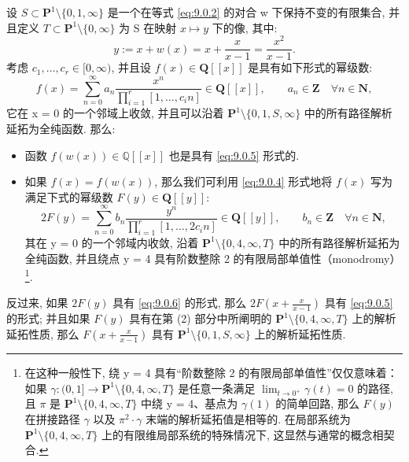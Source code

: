 \begin{lemma}\label{lem:9.0.3}
设 \(S \subset \mathbf{P}^1 \setminus \{0, 1, \infty\}\) 是一个在等式 \eqref{eq:9.0.2} 的对合 w 下保持不变的有限集合, 
并且定义 \(T \subset \mathbf{P}^1 \setminus \{0, \infty\}\) 为 S 在映射 \(x \mapsto y\) 下的像, 其中:
\begin{equation}\label{eq:9.0.4}
y := x + w(x) = x + \frac{x}{x - 1} = \frac{x^2}{x - 1}.
\end{equation}
考虑 \(c_1, \ldots, c_r \in [0, \infty)\), 并且设 \(f(x) \in \mathbf{Q}[\![x]\!]\) 是具有如下形式的幂级数:
\begin{equation}\label{eq:9.0.5}
f(x) = \sum_{n=0}^{\infty} a_n \frac{x^n}{\prod_{i=1}^r [1, \dots, c_i n]} \in \mathbf{Q}[\![x]\!], \qquad a_n \in \mathbf{Z} \quad \forall n \in \mathbf{N},
\end{equation}
它在 x = 0 的一个邻域上收敛, 并且可以沿着 \(\mathbf{P}^1 \setminus \{0,1,S,\infty\}\) 中的所有路径解析延拓为全纯函数. 
那么:
\begin{itemize}
  \item[(1)] 函数 \(f(w(x)) \in \mathbb{Q}[\![x]\!]\) 也是具有 \eqref{eq:9.0.5} 形式的.
  \item[(2)] 如果 \(f(x) = f(w(x))\), 那么我们可利用 \eqref{eq:9.0.4} 形式地将 \(f(x)\) 写为满足下式的幂级数 \(F(y) \in \mathbf{Q}[\![y]\!]\):
  \begin{equation}\label{eq:9.0.6}
  2F(y) = \sum_{n=0}^{\infty} b_n \frac{y^n}{\prod_{i=1}^r [1, \dots, 2c_i n]} \in \mathbf{Q}[\![y]\!], \qquad b_n \in \mathbf{Z} \quad \forall n \in \mathbf{N},
  \end{equation}
  其在 y = 0 的一个邻域内收敛, 沿着 \(\mathbf{P}^1 \setminus \{0, 4, \infty, T\}\) 中的所有路径解析延拓为全纯函数, 
  并且绕点 y = 4 具有阶数整除 2 的有限局部单值性（monodromy）\setcounter{footnote}{35}\footnote{在这种一般性下, 绕 y = 4 具有“阶数整除 2 的有限局部单值性”仅仅意味着：如果 \(\gamma:(0,1]\to \mathbf{P}^1\setminus\{0,4,\infty,T\}\) 是任意一条满足 \(\lim_{t\to 0^+}\gamma(t)=0\) 的路径, 且 \(\pi\) 是 \(\mathbf{P}^1\setminus\{0,4,\infty,T\}\) 中绕 y = 4、基点为 \(\gamma(1)\) 的简单回路, 那么 \(F(y)\) 在拼接路径 \(\gamma\) 以及 \(\pi^2\cdot\gamma\) 末端的解析延拓值是相等的. 在局部系统为 \(\mathbf{P}^1\setminus\{0,4,\infty,T\}\) 上的有限维局部系统的特殊情况下, 这显然与通常的概念相契合.}.
\end{itemize}
反过来, 如果 \(2F(y)\) 具有 \eqref{eq:9.0.6} 的形式, 
那么 \(2F\left(x+\frac{x}{x-1}\right)\) 具有 \eqref{eq:9.0.5} 的形式; 
并且如果 \(F(y)\) 具有在第 (2) 部分中所阐明的 \(\mathbf{P}^1 \setminus \{0,4,\infty,T\}\) 上的解析延拓性质, 
那么 \(F\left(x+\frac{x}{x-1}\right)\) 具有 \(\mathbf{P}^1 \setminus \{0,1,S,\infty\}\) 上的解析延拓性质.
\end{lemma}

